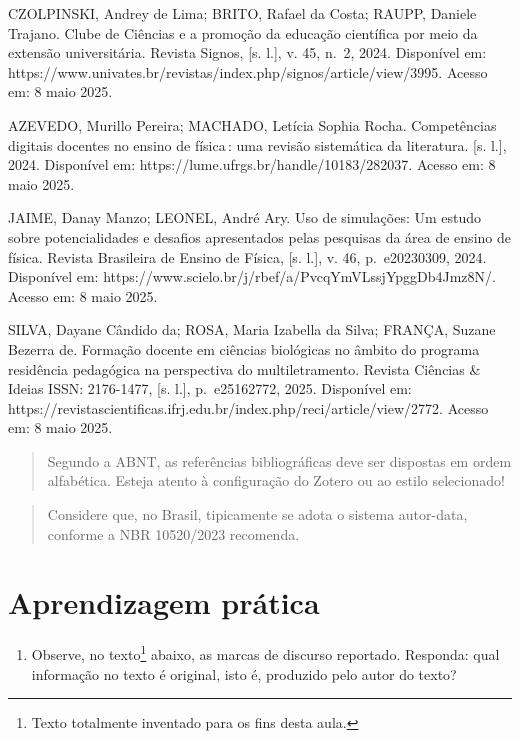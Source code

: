 \documentclass[
  letterpaper,
  DIV=11,
  numbers=noendperiod]{scrreprt}
\providecommand{\tightlist}{%
  \setlength{\itemsep}{0pt}\setlength{\parskip}{0pt}}
\begin{document}
CZOLPINSKI, Andrey de Lima; BRITO, Rafael da Costa; RAUPP, Daniele
Trajano. Clube de Ciências e a promoção da educação científica por meio
da extensão universitária. Revista Signos, {[}s. l.{]}, v. 45, n.~2,
2024. Disponível em:
https://www.univates.br/revistas/index.php/signos/article/view/3995.
Acesso em: 8 maio 2025.

AZEVEDO, Murillo Pereira; MACHADO, Letícia Sophia Rocha. Competências
digitais docentes no ensino de física\,: uma revisão sistemática da
literatura. {[}s. l.{]}, 2024. Disponível em:
https://lume.ufrgs.br/handle/10183/282037. Acesso em: 8 maio 2025.

JAIME, Danay Manzo; LEONEL, André Ary. Uso de simulações: Um estudo
sobre potencialidades e desafios apresentados pelas pesquisas da área de
ensino de física. Revista Brasileira de Ensino de Física, {[}s. l.{]},
v. 46, p.~e20230309, 2024. Disponível em:
https://www.scielo.br/j/rbef/a/PvcqYmVLssjYpggDb4Jmz8N/. Acesso em: 8
maio 2025.

SILVA, Dayane Cândido da; ROSA, Maria Izabella da Silva; FRANÇA, Suzane
Bezerra de. Formação docente em ciências biológicas no âmbito do
programa residência pedagógica na perspectiva do multiletramento.
Revista Ciências \& Ideias ISSN: 2176-1477, {[}s. l.{]}, p.~e25162772,
2025. Disponível em:
https://revistascientificas.ifrj.edu.br/index.php/reci/article/view/2772.
Acesso em: 8 maio 2025.

\begin{quote}
Segundo a ABNT, as referências bibliográficas deve ser dispostas em
ordem alfabética. Esteja atento à configuração do Zotero ou ao estilo
selecionado!
\end{quote}

\begin{quote}
Considere que, no Brasil, tipicamente se adota o sistema autor-data,
conforme a NBR 10520/2023 recomenda.
\end{quote}

\section{Aprendizagem prática}\label{aprendizagem-pruxe1tica-5}

\begin{enumerate}
\def\labelenumi{\arabic{enumi}.}
\tightlist
\item
  Observe, no texto\footnote{Texto totalmente inventado para os fins
    desta aula.} abaixo, as marcas de discurso reportado. Responda: qual
  informação no texto é original, isto é, produzido pelo autor do texto?
\end{enumerate}
\end{document}
